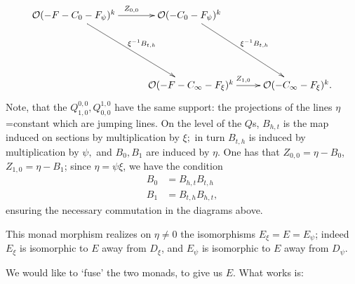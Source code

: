\documentclass[12pt]{article}
\theoremstyle{definition}
\theoremstyle{remark}
\numberwithin{theorem}{section}
\def\bI{{\mathbb {I}}}
\def\pO{{\mathcal O}}
\begin{document}

\begin{equation*} \label{resolution-PQ-TN-7.5}
 \xymatrix{      \pO(-F-C_0-F_\psi)^{k} \ar[r]^{Z_{0,0}}  \ar[ddr]^{\xi^{-1}B_{t,h}}
 &\pO(-C_0-F_\psi)^{k}  \ar[ddr]^{\xi^{-1}B_{t,h}}\\  \\
 &\ \pO(-F-C_\infty-F_\xi)^{k}\ar[r]^{Z_{1,0}}&\pO(-C_\infty-F_\xi)^{k}.
}
\end{equation*}
Note, that the $ Q_{ 1,0}^{0,0} ,Q_{0,0}^{ 1,0}$ have the same support: the projections of the lines $\eta$=constant which are jumping lines.  On the level of the $Q$s, $B_{h,t}$ is the map induced on sections  by multiplication by $\xi;$ in turn $B_{t,h}$ is induced by multiplication by  $\psi,$ and $B_0, B_1$ are induced   by $\eta.$ One has that $Z_{0,0}= \eta-B_0$, $Z_{1,0}= \eta-B_1$; since $\eta= \psi\xi$, we have the condition 
\begin{align} B_0 &= B_{h,t}B_{t,h}\\B_1&= B_{t,h}B_{h,t},\end{align} 
ensuring the necessary commutation in the diagrams above.


This monad morphism realizes on $\eta\neq 0 $ the isomorphisms  $E_\xi=E=E_\psi$; indeed $E_\xi$  is isomorphic to  $E$ away from $D_\xi$, and  $E_\psi$ is isomorphic to  $E$ away from $D_\psi$. 

We would like to `fuse' the two monads, to give us $E$. What   works is:
\end{document}
